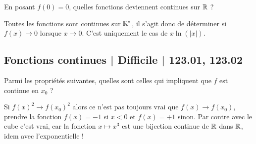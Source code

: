 \begin{question}

En posant $f(0)=0$, quelles fonctions deviennent continues sur $\mathbb{R}$ ?
\begin{answers}



\end{answers}
\begin{explanations}
Toutes les fonctions sont  continues sur $\mathbb{R}^*$, il s'agit donc de déterminer si $f(x) \to 0$ lorsque $x\to0$. C'est uniquement le cas de $x \ln( |x|)$.
\end{explanations}
\end{question}




\subsection{Fonctions continues | Difficile | 123.01, 123.02}


\begin{question}

Parmi les propriétés suivantes, quelles sont celles qui impliquent que $f$ est continue en $x_ 0$ ?
\begin{answers}



\end{answers}
\begin{explanations}
Si $f(x)^2 \to f(x_0)^2$  alors ce n'est pas toujours vrai que $f(x) \to f(x_0)$, prendre la fonction $f(x)=-1$ si $x<0$ et $f(x)=+1$ sinon. Par contre avec le cube c'est vrai, car la fonction $x \mapsto x^3$ est une bijection continue de $\mathbb{R}$ dans $\mathbb{R}$, idem avec l'exponentielle !
\end{explanations}
\end{question}


